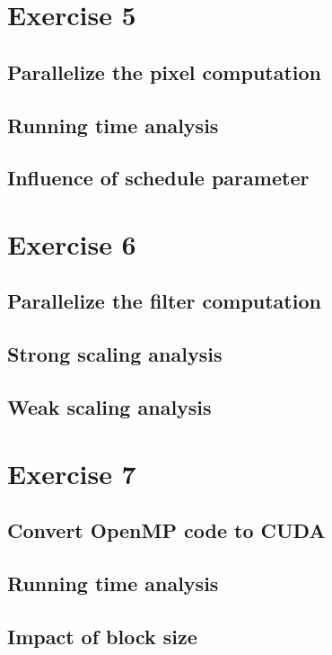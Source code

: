 \documentclass[a4paper,%
11pt,%
DIV12,
headsepline,%
headings=normal,
]{scrartcl}
\begin{document}
\section{Exercise 5}

\subsection{Parallelize the pixel computation}

\subsection{Running time analysis}

\subsection{Influence of schedule parameter}

\section{Exercise 6}

\subsection{Parallelize the filter computation}

\subsection{Strong scaling analysis}

\subsection{Weak scaling analysis}

\section{Exercise 7}

\subsection{Convert OpenMP code to CUDA}

\subsection{Running time analysis}

\subsection{Impact of block size}
\end{document}
